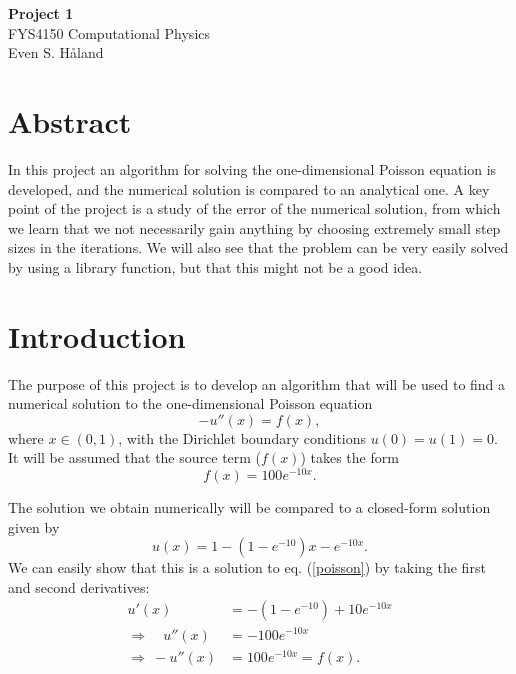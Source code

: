 \documentclass[12pt, a4paper]{article}
\begin{document}
\begin{titlepage}
\begin{center}
\vspace*{3cm}
\Huge
\textbf{Project 1} \\
\Large  
FYS4150 Computational Physics 
\vspace*{3cm} \\ 

Even S. Håland 
\vspace*{5cm} \\

\normalsize
\section*{Abstract}
In this project an algorithm for solving the one-dimensional Poisson equation is developed, and the 
numerical solution is compared to an analytical one. A key point of the project is a study of the
error of the numerical solution, from which we learn that we not necessarily gain anything by choosing 
extremely small step sizes in the iterations. We will also see that the problem can be very easily 
solved by using a library function, but that this might not be a good idea.  

\end{center}
\end{titlepage}


\section{Introduction}

The purpose of this project is to develop an algorithm that will be used to find a numerical solution 
to the one-dimensional Poisson equation 
\begin{equation}
-u''(x) = f(x), 
\label{poisson}
\end{equation}
where $x\in (0,1)$, with the Dirichlet boundary conditions $u(0)=u(1)=0$. It will be assumed that the 
source term ($f(x)$) takes the form 
\begin{equation}
f(x) = 100e^{-10x}. 
\label{f(x)}
\end{equation}

The solution we obtain numerically will be compared to a closed-form solution given by 
\begin{equation}
u(x) = 1- \left(1-e^{-10}\right)x - e^{-10x}. 
\label{closed-form}
\end{equation}
We can easily show that this is a solution to eq. (\ref{poisson}) by taking the first and second 
derivatives: 
\begin{align*}
    u'(x) & = -\left(1-e^{-10}\right) + 10e^{-10x} \\ 
\Rightarrow \quad  u''(x) & = -100e^{-10x} \\
\Rightarrow \: -u''(x) & = 100e^{-10x} = f(x).  
\end{align*}
\end{document}
